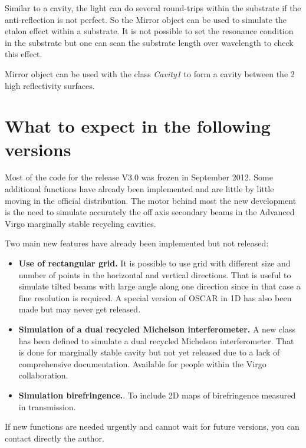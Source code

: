 Similar to a cavity, the light can do several round-trips within the substrate if the anti-reflection is not perfect. So the Mirror object can be used to simulate the etalon effect within a substrate. It is not possible to set the resonance condition in the substrate but one can scan the substrate length over wavelength to check this effect.

Mirror object can be used with the class \textsl{Cavity1} to form a cavity between the 2 high reflectivity surfaces.


\section{What to expect in the following versions}

Most of the code for the release V3.0 was frozen in September 2012. Some additional functions have already been implemented and are little by little moving in the official distribution. The motor behind most the new development is the need to simulate accurately the off axis secondary beams in the Advanced Virgo marginally stable recycling cavities.

Two main new features have already been implemented but not released:

\begin{itemize}
  \item \textbf{Use of rectangular grid.} It is possible to use grid with different size and number of points in the horizontal and vertical directions. That is useful to simulate tilted beams with large angle along one direction since in that case a fine resolution is required. A special version of OSCAR in 1D has also been made but may never get released.
  \item \textbf{Simulation of a dual recycled Michelson interferometer.} A new class has been defined to simulate a dual recycled Michelson interferometer. That is done for marginally stable cavity but not yet released due to a lack of comprehensive documentation. Available for people within the Virgo collaboration.
   \item \textbf{Simulation birefringence.}. To include 2D maps of birefringence measured in transmission.
\end{itemize}

If new functions are needed urgently and cannot wait for future versions, you can contact directly the author.


